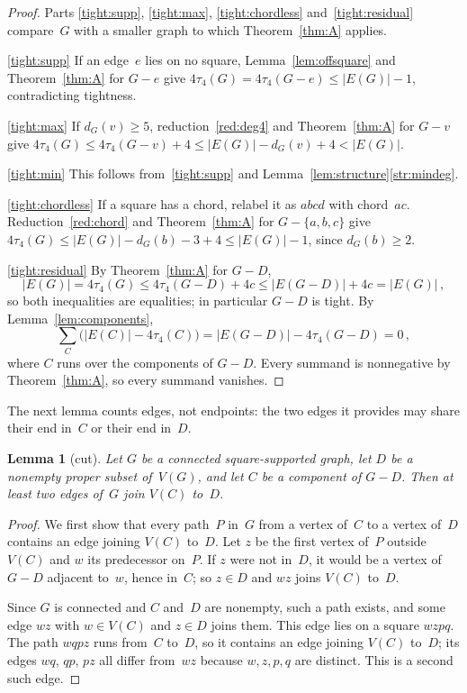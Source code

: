 \documentclass[11pt,letterpaper]{article}
\numberwithin{equation}{section}
\theoremstyle{plain}
\newtheorem{lemma}[theorem]{Lemma}
\theoremstyle{definition}
\theoremstyle{remark}
\begin{document}
\begin{proof}
Parts \ref{tight:supp}, \ref{tight:max}, \ref{tight:chordless} and~\ref{tight:residual} compare~$G$ with a smaller graph to which Theorem~\ref{thm:A} applies.

\ref{tight:supp} If an edge~$e$ lies on no square, Lemma~\ref{lem:offsquare} and Theorem~\ref{thm:A} for $G-e$ give $4\tau_4(G)=4\tau_4(G-e)\le|E(G)|-1$, contradicting tightness.

\ref{tight:max} If $d_G(v)\ge5$, reduction~\ref{red:deg4} and Theorem~\ref{thm:A} for $G-v$ give $4\tau_4(G)\le4\tau_4(G-v)+4\le|E(G)|-d_G(v)+4<|E(G)|$.

\ref{tight:min} This follows from~\ref{tight:supp} and Lemma~\ref{lem:structure}\ref{str:mindeg}.

\ref{tight:chordless} If a square has a chord, relabel it as $abcd$ with chord~$ac$. Reduction~\ref{red:chord} and Theorem~\ref{thm:A} for $G-\{a,b,c\}$ give $4\tau_4(G)\le|E(G)|-d_G(b)-3+4\le|E(G)|-1$, since $d_G(b)\ge2$.

\ref{tight:residual} By Theorem~\ref{thm:A} for $G-D$,
\begin{equation*}
|E(G)|=4\tau_4(G)\le4\tau_4(G-D)+4c\le|E(G-D)|+4c=|E(G)|\,,
\end{equation*}
so both inequalities are equalities; in particular $G-D$ is tight. By Lemma~\ref{lem:components},
\begin{equation*}
\sum_C\bigl(|E(C)|-4\tau_4(C)\bigr)=|E(G-D)|-4\tau_4(G-D)=0\,,
\end{equation*}
where $C$ runs over the components of $G-D$. Every summand is nonnegative by Theorem~\ref{thm:A}, so every summand vanishes.
\end{proof}

The next lemma counts edges, not endpoints: the two edges it provides may share their end in~$C$ or their end in~$D$.

\begin{lemma}[cut]\label{lem:cut}
Let $G$ be a connected square-supported graph, let $D$ be a nonempty proper subset of~$V(G)$, and let $C$ be a component of $G-D$. Then at least two edges of~$G$ join $V(C)$ to~$D$.
\end{lemma}

\begin{proof}
We first show that every path~$P$ in~$G$ from a vertex of~$C$ to a vertex of~$D$ contains an edge joining $V(C)$ to~$D$. Let $z$ be the first vertex of~$P$ outside~$V(C)$ and $w$ its predecessor on~$P$. If $z$ were not in~$D$, it would be a vertex of $G-D$ adjacent to~$w$, hence in~$C$; so $z\in D$ and $wz$ joins $V(C)$ to~$D$.

Since $G$ is connected and $C$ and~$D$ are nonempty, such a path exists, and some edge $wz$ with $w\in V(C)$ and $z\in D$ joins them. This edge lies on a square $wzpq$. The path $wqpz$ runs from~$C$ to~$D$, so it contains an edge joining $V(C)$ to~$D$; its edges $wq$, $qp$, $pz$ all differ from~$wz$ because $w,z,p,q$ are distinct. This is a second such edge.
\end{proof}
\end{document}
